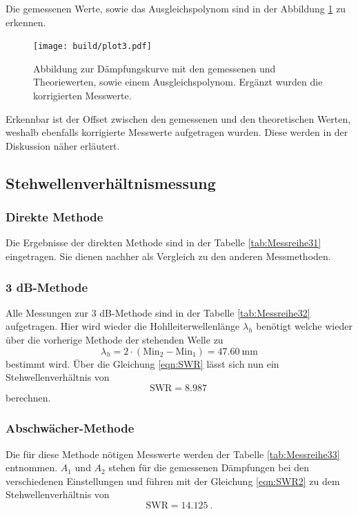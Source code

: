 Die gemessenen Werte, sowie das Ausgleichspolynom sind in der Abbildung \ref{111} zu erkennen.
\begin{figure}
    \centering
    \texttt{[image: build/plot3.pdf]}
    \caption{Abbildung zur Dämpfungskurve mit den gemessenen und Theoriewerten, sowie einem Ausgleichspolynom. Ergänzt wurden die korrigierten Messwerte.} 
    \label{111}
\end{figure}
Erkennbar ist der Offset zwischen den gemessenen und den theoretischen Werten, weshalb ebenfalls korrigierte Messwerte aufgetragen wurden. Diese werden in der Diskussion näher
erläutert.

\subsection{Stehwellenverhältnismessung}

\subsubsection{Direkte Methode}
Die Ergebnisse der direkten Methode sind in der Tabelle \ref{tab:Messreihe31} eingetragen. Sie dienen nachher als Vergleich zu den anderen Messmethoden.

\subsubsection{3 dB-Methode}
Alle Messungen zur 3 dB-Methode sind in der Tabelle \ref{tab:Messreihe32} aufgetragen. Hier wird wieder die Hohlleiterwellenlänge $\lambda_h$ 
benötigt welche wieder über die vorherige Methode der stehenden Welle zu
\begin{equation*}
\lambda_h = 2 \cdot (\text{Min}_2 - \text{Min}_1) = \SI{47.60}{\milli\meter}
\end{equation*}
bestimmt wird.
Über die Gleichung \ref{eqn:SWR} lässt sich nun ein Stehwellenverhältnis von
\begin{equation*}
\text{SWR} = \SI{8.987}{}
\end{equation*}
berechnen.

\subsubsection{Abschwächer-Methode}
Die für diese Methode nötigen Messwerte werden der Tabelle \ref{tab:Messreihe33} entnommen.
$A_1$ und $A_2$ stehen für die gemessenen Dämpfungen bei den verschiedenen Einstellungen und führen mit der Gleichung 
\eqref{eqn:SWR2} zu dem Stehwellenverhältnis von
\begin{equation*}
\text{SWR} = \SI{14.125}{}.
\end{equation*}
